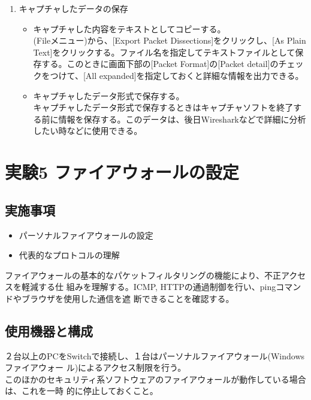 \documentclass[10pt]{article}
\begin{document}
\begin{enumerate}
    \item キャプチャしたデータの保存
        \begin{itemize}
            \item キャプチャした内容をテキストとしてコピーする。 \\
                (Fileメニュー)から、[Export Packet Dissections]をクリックし、[As Plain Text]をクリックする。ファイル名を指定してテキストファイルとして保存する。このときに画面下部の[Packet Format]の[Packet detail]のチェックをつけて、[All expanded]を指定しておくと詳細な情報を出力できる。
            \item キャプチャしたデータ形式で保存する。\\
                キャプチャしたデータ形式で保存するときはキャプチャソフトを終了する前に情報を保存する。このデータは、後日Wiresharkなどで詳細に分析したい時などに使用できる。 
        \end{itemize}
\end{enumerate}

\section{実験5 ファイアウォールの設定 }

\subsection{実施事項}
\begin{itemize}
    \item パーソナルファイアウォールの設定
    \item 代表的なプロトコルの理解
\end{itemize}
ファイアウォールの基本的なパケットフィルタリングの機能により、不正アクセスを軽減する仕
組みを理解する。ICMP, HTTPの通過制御を行い、pingコマンドやブラウザを使用した通信を遮
断できることを確認する。 

\subsection{使用機器と構成}
２台以上のPCをSwitchで接続し、１台はパーソナルファイアウォール(Windows ファイアウォー
ル)によるアクセス制限を行う。\\
このほかのセキュリティ系ソフトウェアのファイアウォールが動作している場合は、これを一時
的に停止しておくこと。
\end{document}

